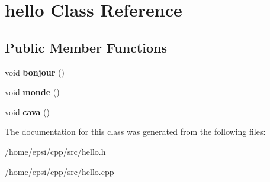 \hypertarget{classhello}{}\section{hello Class Reference}
\label{classhello}
\subsection*{Public Member Functions}
\begin{DoxyCompactItemize}
\item 
\mbox{\label{classhello_a499d8fc624dd2cb66ffd66877b0dea52}} 
void {\bfseries bonjour} ()
\item 
\mbox{\label{classhello_a7628ad2c8c189d9cda7a00a16f2ef60d}} 
void {\bfseries monde} ()
\item 
\mbox{\label{classhello_a92957333d0410388c997f6fe0b57b9e3}} 
void {\bfseries cava} ()
\end{DoxyCompactItemize}


The documentation for this class was generated from the following files\+:\begin{DoxyCompactItemize}
\item 
/home/epsi/cpp/src/hello.\+h\item 
/home/epsi/cpp/src/hello.\+cpp\end{DoxyCompactItemize}
